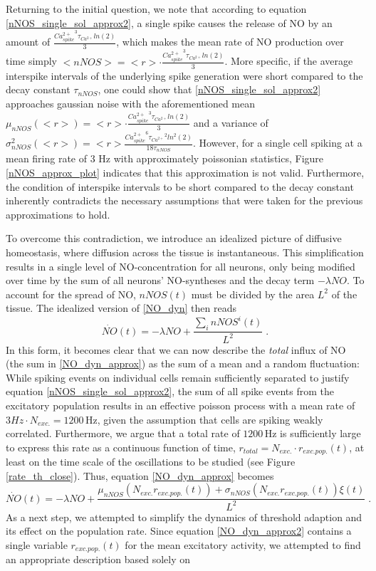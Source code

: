 \documentclass[10pt,a4paper]{article}
\begin{document}
Returning to the initial question, we note that according to equation \eqref{nNOS_single_sol_approx2}, a single spike causes the release of NO by an amount of $\frac{{Ca^{2+}_{spike}}^3 \tau_{Ca^{2+}}ln(2)}{3}$, which makes the mean rate of NO production over time simply $<nNOS> = <r> \cdot \frac{{Ca^{2+}_{spike}}^3 \tau_{Ca^{2+}}ln(2)}{3}$. More specific, if the average interspike intervals of the underlying spike generation were short compared to the decay constant $\tau_{nNOS}$, one could show that \eqref{nNOS_single_sol_approx2} approaches gaussian noise with the aforementioned mean $\mu_{nNOS}(<r>) =  <r> \cdot \frac{{Ca^{2+}_{spike}}^3 \tau_{Ca^{2+}}ln(2)}{3}$ and a variance of $\sigma^2_{nNOS}(<r>) = <r> \frac{{Ca^{2+}_{spike}}^6 {\tau_{Ca^{2+}}}^2 ln^2(2)}{18\tau_{nNOS}}$. However, for a single cell spiking at a mean firing rate of 3 Hz with approximately poissonian statistics, Figure \ref{nNOS_approx_plot} indicates that this approximation is not valid. Furthermore, the condition of interspike intervals to be short compared to the decay constant inherently contradicts the necessary assumptions that were taken for the previous approximations to hold.

To overcome this contradiction, we introduce an idealized picture of diffusive homeostasis, where diffusion across the tissue is instantaneous. This simplification results in a single level of NO-concentration for all neurons, only being modified over time by the sum of all neurons' NO-syntheses and the decay term $-\lambda NO$. To account for the spread of NO, $nNOS(t)$ must be divided by the area $L^2$ of the tissue. The idealized version of \eqref{NO_dyn} then reads
\begin{equation}
\dot{NO}(t)=-\lambda NO + \frac{\sum_{i} nNOS^i(t)}{L^2}\;.
\label{NO_dyn_approx}
\end{equation}
In this form, it becomes clear that we can now describe the \emph{total} influx of NO (the sum in \eqref{NO_dyn_approx}) as the sum of a mean and a random fluctuation: While spiking events on individual cells remain sufficiently separated to justify equation \eqref{nNOS_single_sol_approx2}, the sum of all spike events from the excitatory population results in an effective poisson process with a mean rate of $3 Hz \cdot N_{exc.} = \mathrm{1200\,Hz}$, given the assumption that cells are spiking weakly correlated. Furthermore, we argue that a total rate of $\mathrm{1200\,Hz}$ is sufficiently large to express this rate as a continuous function of time, $r_{total} = N_{exc.}\cdot r_{exc.pop.}(t)$, at least on the time scale of the oscillations to be studied (see  Figure \ref{rate_th_close}). Thus, equation \eqref{NO_dyn_approx} becomes
\begin{equation}
\dot{NO}(t)=-\lambda NO + \frac{\mu_{nNOS}(N_{exc.}r_{exc.pop.}(t)) + \sigma_{nNOS}(N_{exc.}r_{exc.pop.}(t)) \xi (t)}{L^2}\;.
\label{NO_dyn_approx2}
\end{equation}
As a next step, we attempted to simplify the dynamics of threshold adaption and its effect on the population rate. Since equation \eqref{NO_dyn_approx2} contains a single variable $r_{exc.pop.}(t)$ for the mean excitatory activity, we attempted to find an appropriate description based solely on 
\end{document}
